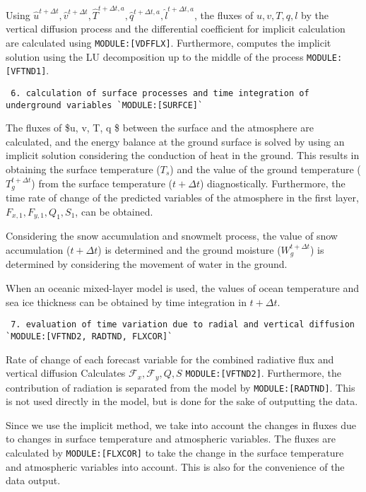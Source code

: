 Using
\(\hat{u}^{t+\Delta t}, \hat{v}^{t+\Delta t}, \hat{T}^{t+\Delta t,a}, \hat{q}^{t+\Delta t,a}, \hat{l}^{t+\Delta t,a}\),
the fluxes of \(u, v, T, q, l\) by the vertical diffusion process and
the differential coefficient for implicit calculation are calculated
using \texttt{MODULE:{[}VDFFLX{]}}. Furthermore, computes the implicit
solution using the LU decomposition up to the middle of the process
\texttt{MODULE:{[}VFTND1{]}}.

\begin{verbatim}
 6. calculation of surface processes and time integration of underground variables `MODULE:[SURFCE]`
\end{verbatim}

The fluxes of \$u, v, T, q \$ between the surface and the atmosphere are
calculated, and the energy balance at the ground surface is solved by
using an implicit solution considering the conduction of heat in the
ground. This results in obtaining the surface temperature (\(T_s\)) and
the value of the ground temperature (\(T_g^{t+\Delta t}\)) from the
surface temperature (\(t+\Delta t\)) diagnostically. Furthermore, the
time rate of change of the predicted variables of the atmosphere in the
first layer, \(F_{x,1}, F_{y,1}, Q_1, S_1\), can be obtained.

Considering the snow accumulation and snowmelt process, the value of
snow accumulation (\(t+\Delta t\)) is determined and the ground moisture
(\(W_g^{t+\Delta t}\)) is determined by considering the movement of
water in the ground.

When an oceanic mixed-layer model is used, the values of ocean
temperature and sea ice thickness can be obtained by time integration in
\(t+\Delta t\).

\begin{verbatim}
 7. evaluation of time variation due to radial and vertical diffusion `MODULE:[VFTND2, RADTND, FLXCOR]`
\end{verbatim}

Rate of change of each forecast variable for the combined radiative flux
and vertical diffusion Calculates
\({\mathcal F}_x, {\mathcal F}_y, Q, S\) \texttt{MODULE:{[}VFTND2{]}}.
Furthermore, the contribution of radiation is separated from the model
by \texttt{MODULE:{[}RADTND{]}}. This is not used directly in the model,
but is done for the sake of outputting the data.

Since we use the implicit method, we take into account the changes in
fluxes due to changes in surface temperature and atmospheric variables.
The fluxes are calculated by \texttt{MODULE:{[}FLXCOR{]}} to take the
change in the surface temperature and atmospheric variables into
account. This is also for the convenience of the data output.

